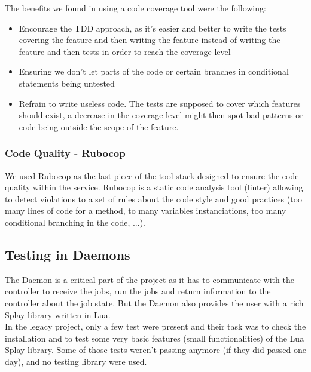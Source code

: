 \documentclass{eplmastersthesis}
\begin{document}
          The benefits we found in using a code coverage tool were the
          following:

          \begin{itemize}
            \item Encourage the TDD approach, as it's easier and better to
            write the tests covering the feature and then writing the feature
            instead of writing the feature and then tests in order to reach
            the coverage level
            \item Ensuring we don't let parts of the code or certain branches
            in conditional statements being untested
            \item Refrain to write useless code. The tests are supposed to cover
            which features should exist, a decrease in the coverage level
            might then spot bad patterns or code being outside the scope
            of the feature.
          \end{itemize}

        \subsubsection{Code Quality - Rubocop}

          We used Rubocop as the last piece of the tool stack designed to ensure
          the code quality within the service. Rubocop is a static code analysis
          tool (linter) allowing to detect violations to a set of rules about
          the code style and good practices (too many lines of code for a method,
          to many variables instanciations, too many conditional branching
          in the code, ...).

      \subsection{Testing in Daemons}

        The Daemon is a critical part of the project as it has to communicate
        with the controller to receive the jobs, run the jobs and return
        information to the controller about the job state. But the Daemon also
        provides the user with a rich Splay library written in Lua.\\
        In the legacy project, only a few test were present and their
        task was to check the installation and to test some very basic features
        (small functionalities) of the Lua Splay library. Some of those tests
        weren't passing anymore (if they did passed one day), and no testing
        library were used.\\
\end{document}
